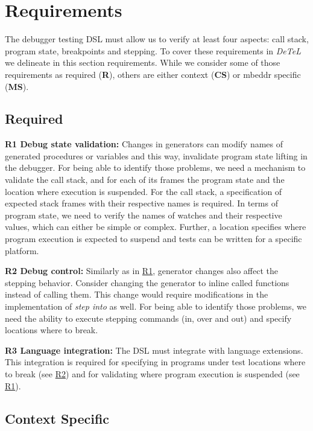 \section{Requirements}
\label{DesignDecisions}

The debugger testing \ac{DSL} must allow us to verify at least
four aspects: call stack, program state, breakpoints and stepping.
To cover these requirements in \emph{DeTeL} we delineate in this section
requirements. While we
consider some of those requirements as required (\textbf{R}), others are either
context (\textbf{CS}) or mbeddr specific (\textbf{MS}).

\subsection{Required}

\textbf{\label{R1}R1 Debug state validation:} 
Changes in generators can modify names of generated procedures or
variables and this way, \eg invalidate program state lifting in the
debugger.
For being able to identify those problems, we need a  mechanism to validate
the call stack, and for each of its frames the program state and the location where
execution is suspended. For the call stack,
a specification of expected stack frames with their respective names is
required. In terms of program state, we need to verify the names of watches 
and their respective values, which can either be simple
or complex. Further, a location specifies where program execution is
expected to suspend and tests can be written for a specific platform. 

\textbf{\label{R2}R2 Debug control:} Similarly as in \hyperref[R1]{R1},
generator changes also affect the stepping behavior. 
Consider changing the  generator to inline called
functions instead of calling them. This change would require modifications in
the implementation of \emph{step into} as well. For being able to identify
those problems, we need the ability to execute stepping commands (in, over
and out) and specify locations where to break.

\textbf{\label{R3}R3 Language integration:} The
\ac{DSL} must integrate with language extensions.
This integration is required for specifying in programs under test
locations where to break (see \hyperref[R2]{R2}) and for validating where
program execution is suspended (see \hyperref[R1]{R1}).

\subsection{Context Specific}

